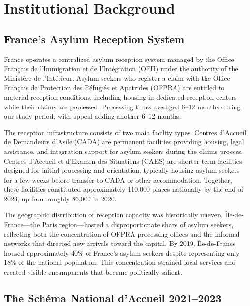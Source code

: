\documentclass[12pt]{article}
\begin{document}
\section{Institutional Background}
\label{sec:background}

\subsection{France's Asylum Reception System}

France operates a centralized asylum reception system managed by the Office Fran\c{c}ais de l'Immigration et de l'Int\'egration (OFII) under the authority of the Minist\`ere de l'Int\'erieur. Asylum seekers who register a claim with the Office Fran\c{c}ais de Protection des R\'efugi\'es et Apatrides (OFPRA) are entitled to material reception conditions, including housing in dedicated reception centers while their claims are processed. Processing times averaged 6--12 months during our study period, with appeal adding another 6--12 months.

The reception infrastructure consists of two main facility types. Centres d'Accueil de Demandeurs d'Asile (CADA) are permanent facilities providing housing, legal assistance, and integration support for asylum seekers during the claims process. Centres d'Accueil et d'Examen des Situations (CAES) are shorter-term facilities designed for initial processing and orientation, typically housing asylum seekers for a few weeks before transfer to CADA or other accommodation. Together, these facilities constituted approximately 110,000 places nationally by the end of 2023, up from roughly 86,000 in 2020.

The geographic distribution of reception capacity was historically uneven. \^Ile-de-France---the Paris region---hosted a disproportionate share of asylum seekers, reflecting both the concentration of OFPRA processing offices and the informal networks that directed new arrivals toward the capital. By 2019, \^Ile-de-France housed approximately 40\% of France's asylum seekers despite representing only 18\% of the national population. This concentration strained local services and created visible encampments that became politically salient.

\subsection{The Sch\'ema National d'Accueil 2021--2023}
\end{document}
